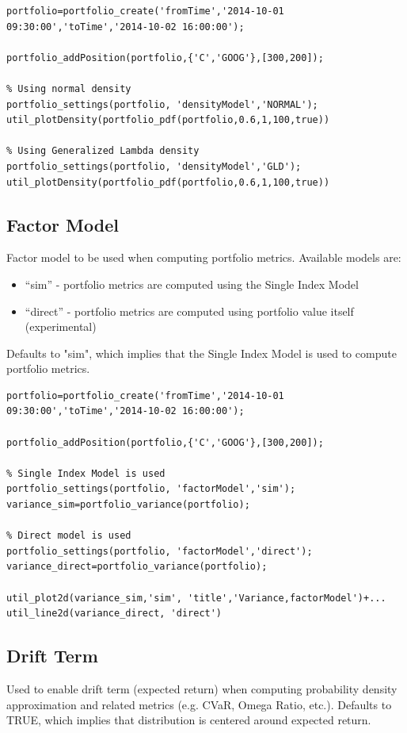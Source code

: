 \documentclass[letterpaper]{report}
\newcounter{N}
\begin{document}
\begin{lstlisting}
portfolio=portfolio_create('fromTime','2014-10-01 09:30:00','toTime','2014-10-02 16:00:00');

portfolio_addPosition(portfolio,{'C','GOOG'},[300,200]);

% Using normal density
portfolio_settings(portfolio, 'densityModel','NORMAL');
util_plotDensity(portfolio_pdf(portfolio,0.6,1,100,true))

% Using Generalized Lambda density
portfolio_settings(portfolio, 'densityModel','GLD');
util_plotDensity(portfolio_pdf(portfolio,0.6,1,100,true))
\end{lstlisting}

\subsection {Factor Model}
Factor model to be used when computing portfolio metrics. Available models are: 
\begin{itemize} 
  \item ``sim'' - portfolio metrics are computed using the Single Index Model
  \item ``direct'' - portfolio metrics are computed using portfolio value itself
  (experimental)
\end{itemize}
Defaults to "sim", which implies that the Single Index Model is used to compute portfolio metrics.

\begin{lstlisting}
portfolio=portfolio_create('fromTime','2014-10-01 09:30:00','toTime','2014-10-02 16:00:00');

portfolio_addPosition(portfolio,{'C','GOOG'},[300,200]);

% Single Index Model is used
portfolio_settings(portfolio, 'factorModel','sim');
variance_sim=portfolio_variance(portfolio);

% Direct model is used
portfolio_settings(portfolio, 'factorModel','direct');
variance_direct=portfolio_variance(portfolio);

util_plot2d(variance_sim,'sim', 'title','Variance,factorModel')+...
util_line2d(variance_direct, 'direct')
\end{lstlisting}

\subsection{Drift Term}
Used to enable drift term (expected return) when computing probability density approximation and related metrics (e.g. CVaR, Omega Ratio, etc.).
Defaults to TRUE, which implies that distribution is centered around expected return.
\end{document}
